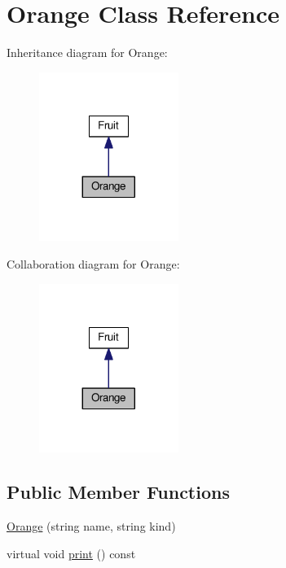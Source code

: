 \hypertarget{classOrange}{}\section{Orange Class Reference}
\label{classOrange}


Inheritance diagram for Orange\+:
\nopagebreak
\begin{figure}[H]
\begin{center}
\leavevmode
\includegraphics[width=128pt]{classOrange__inherit__graph}
\end{center}
\end{figure}


Collaboration diagram for Orange\+:
\nopagebreak
\begin{figure}[H]
\begin{center}
\leavevmode
\includegraphics[width=128pt]{classOrange__coll__graph}
\end{center}
\end{figure}
\subsection*{Public Member Functions}
\begin{DoxyCompactItemize}
\item 
\hyperlink{classOrange_ad34fe19e80692b3f206aa22606cf106d}{Orange} (string name, string kind)
\item 
virtual void \hyperlink{classOrange_acb75bbb15104ce63afa0cc6712e239e4}{print} () const 
\end{DoxyCompactItemize}
